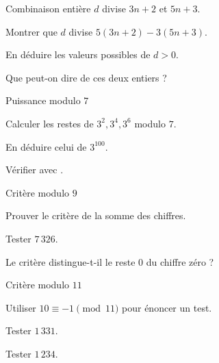 \begingroup\renewcommand{\otBesoinPlace}[1]{}\begin{minipage}{\linewidth}
\begin{exercice}[2]{Combinaison entière}
$d$ divise $3n+2$ et $5n+3$.
\begin{questions}
\item Montrer que $d$ divise $5(3n+2)-3(5n+3)$.
\item En déduire les valeurs possibles de $d>0$.
\item Que peut-on dire de ces deux entiers ?
\end{questions}
\end{exercice}
\begin{exercice}[2]{Puissance modulo $7$}

\begin{questions}
\item Calculer les restes de $3^2,3^4,3^6$ modulo $7$.
\item En déduire celui de $3^{100}$.
\item Vérifier avec .
\end{questions}
\end{exercice}
\begin{exercice}[2]{Critère modulo $9$}

\begin{questions}
\item Prouver le critère de la somme des chiffres.
\item Tester $7\,326$.
\item Le critère distingue-t-il le reste $0$ du chiffre zéro ?
\end{questions}
\end{exercice}
\begin{exercice}[2]{Critère modulo $11$}

\begin{questions}
\item Utiliser $10\equiv-1\pmod{11}$ pour énoncer un test.
\item Tester $1\,331$.
\item Tester $1\,234$.
\end{questions}
\end{exercice}
\end{minipage}\endgroup
\clearpage
{}
